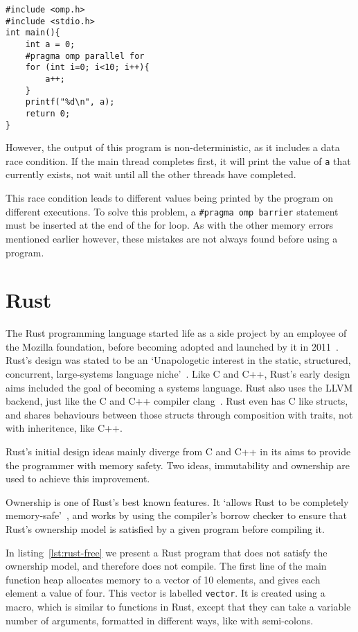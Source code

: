 \begin{code}
\begin{verbatim}
#include <omp.h>
#include <stdio.h>
int main(){
    int a = 0;
    #pragma omp parallel for
    for (int i=0; i<10; i++){
        a++;
    }
    printf("%d\n", a);
    return 0;
}
\end{verbatim}
\label{lst:omp-eg}
\end{code}

However, the output of this program is non-deterministic, as it includes a data race condition. If the main thread completes first, it will print the value of \texttt{a} that currently exists, not wait until all the other threads have completed. 

This race condition leads to different values being printed by the program on different executions. To solve this problem, a \texttt{\#pragma omp barrier} statement must be inserted at the end of the for loop. As with the other memory errors mentioned earlier however, these mistakes are not always found before using a program.

\section{Rust}\label{sec:rust}
The Rust programming language started life as a side project by an employee of the Mozilla foundation, before becoming adopted and launched by it in 2011~\cite{FutureTense}. Rust's design was stated to be an `Unapologetic interest in the static, structured, concurrent, large-systems language niche'~\cite{pServo}. Like C and C++, Rust's early design aims included the goal of becoming a systems language.
Rust also uses the LLVM backend, just like the C and C++ compiler clang~\cite{rustClang}.
Rust even has C like structs, and shares behaviours between those structs through composition with traits, not with inheritence, like C++.

Rust's initial design ideas mainly diverge from C and C++ in its aims to provide the programmer with memory safety. Two ideas, immutability and ownership are used to achieve this improvement. 

Ownership is one of Rust's best known features. It `allows Rust to be completely memory-safe'~\cite{NomOwner}, and works by using the compiler's borrow checker to ensure that Rust's ownership model is satisfied by a given program before compiling it.

In listing~\ref{lst:rust-free} we present a Rust program that does not satisfy the ownership model, and therefore does not compile. The first line of the main function heap allocates memory to a vector of 10 elements, and gives each element a value of four. This vector is labelled \texttt{vector}. It is created using a macro, which is similar to functions in Rust, except that they can take a variable number of arguments, formatted in different ways, like with semi-colons.

